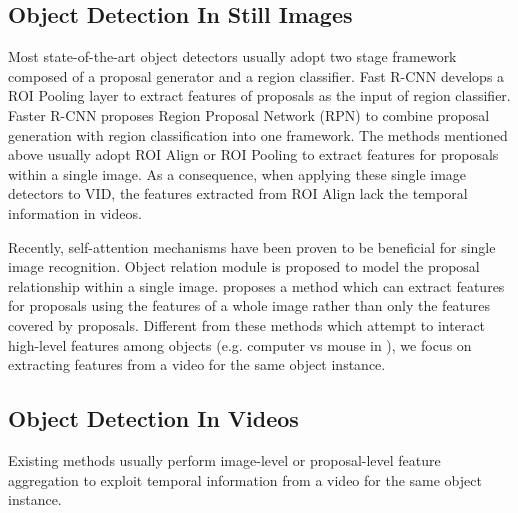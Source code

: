 \documentclass[letterpaper]{article} \usepackage{aaai21}  \usepackage{times}  \usepackage{helvet} \usepackage{courier}  \usepackage[hyphens]{url}  \usepackage{graphicx} \usepackage{hyperref}
\begin{document}
\subsection{Object Detection In Still Images}
Most state-of-the-art object detectors \cite{girshick2014rich,girshick2015fast,ren2015faster,dai2016r} usually adopt two stage framework composed of a proposal generator and a region classifier. Fast R-CNN \cite{girshick2015fast} develops a ROI Pooling layer to extract features of proposals as the input of region classifier. Faster R-CNN \cite{ren2015faster} proposes Region Proposal Network (RPN) to combine proposal generation with region classification into one framework.
The methods mentioned above usually adopt ROI Align \cite{He_2017_ICCV} or ROI Pooling to extract features for proposals within a single image. As a consequence, when applying these single image detectors to VID, the features extracted from ROI Align lack the temporal information in videos.

Recently, self-attention mechanisms \cite{vaswani2017attention} have been proven to be beneficial for single image recognition. Object relation module \cite{hu2018relation} is proposed to model the proposal relationship within a single image. \cite{gu2018learning} proposes a method which can extract features for proposals using the features of a whole image rather than only the features covered by proposals. Different from these methods which attempt to interact high-level features among objects (e.g. computer vs mouse in \cite{hu2018relation}), we focus on extracting features from a video for the same object instance.

\subsection{Object Detection In Videos}
Existing methods usually perform image-level or proposal-level feature aggregation to exploit temporal information from a video for the same object instance.
\end{document}
